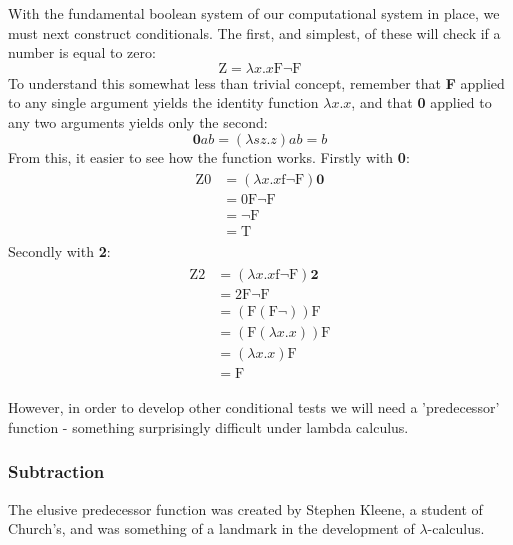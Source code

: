 \documentclass[Master.tex]{subfiles}
\begin{document}
With the fundamental boolean system of our computational system in place, we must next construct conditionals. The first, and simplest, of these will check if a number is equal to zero:
\begin{equation*}
\bm{\mathrm{Z}} = \lambda x.x\bm{\mathrm{F\lnot F}}
\end{equation*}
To understand this somewhat less than trivial concept, remember that \textbf{F} applied to any single argument yields the identity function $\lambda x.x$, and that \textbf{0} applied to any two arguments yields only the second:
\begin{equation*}
\bm{0}ab = (\lambda sz.z)ab = b
\end{equation*}
From this, it easier to see how the function works. Firstly with \textbf{0}:
\begin{gather*}
\begin{aligned}
\bm{\mathrm{Z0}} &= (\lambda x.x\bm{\mathrm{f\lnot F}})\bm{0}\\
&= \bm{\mathrm{0F\lnot F}}\\
&= \bm{\mathrm{\lnot F}}\\
&= \bm{\mathrm{T}}
\end{aligned}
\end{gather*}
Secondly with \textbf{2}:
\begin{gather*}
\begin{aligned}
\bm{\mathrm{Z2}} &= (\lambda x.x\bm{\mathrm{f\lnot F}})\bm{2}\\
&= \bm{\mathrm{2F\lnot F}}\\
&= (\bm{\mathrm{F}}(\bm{\mathrm{F}}\lnot)) \bm{\mathrm{F}}\\
&= (\bm{\mathrm{F}}(\lambda x.x))\bm{\mathrm{F}}\\
&= (\lambda x.x)\bm{\mathrm{F}}\\
&= \bm{\mathrm{F}} 
\end{aligned}
\end{gather*}

However, in order to develop other conditional tests we will need a 'predecessor' function - something surprisingly difficult under lambda calculus.
\subsubsection{Subtraction}

The elusive predecessor function was created by Stephen Kleene, a student of Church's, and was something of a landmark in the development of $\lambda$-calculus.
\end{document}
